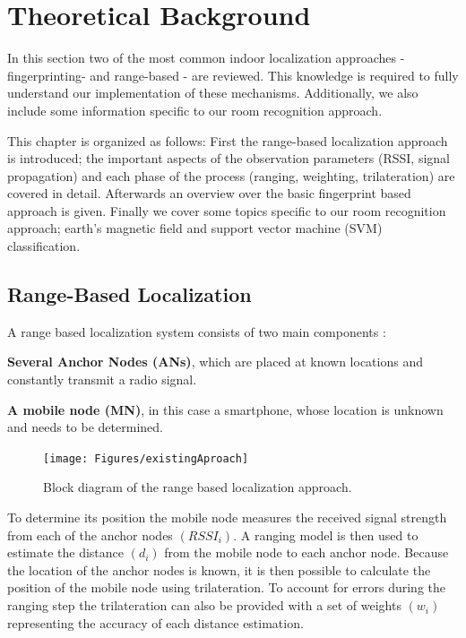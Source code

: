 
\chapter{Theoretical Background} %

\label{Chapter2} %

In this section two of the most common indoor localization approaches - fingerprinting- and range-based - are reviewed. This knowledge is required to fully understand our implementation of these mechanisms. Additionally, we also include some information specific to our room recognition approach.

This chapter is organized as follows: First the range-based localization approach is introduced; the important aspects of the observation parameters (RSSI, signal propagation) and each phase of the process (ranging, weighting, trilateration) are covered in detail. Afterwards an overview over the basic fingerprint based approach is given. Finally we cover some topics specific to our room recognition approach; earth's magnetic field and support vector machine (SVM) classification.

\section{Range-Based Localization}
\label{therory:range-based}

A range based localization system consists of two main components \citep{surveyIndoorTechniques}:

\textbf{Several Anchor Nodes (ANs)}, which are placed at known locations and constantly transmit a radio signal.

\textbf{A mobile node (MN)}, in this case a smartphone, whose location is unknown and needs to be determined.

\begin{figure}[ht]
\centering
\texttt{[image: Figures/existingAproach]}
\decoRule
\caption[Range-based localization approach]{Block diagram of the range based localization approach.}
\label{fig:existingApproach}
\end{figure}

To determine its position the mobile node measures the received signal strength from each of the anchor nodes $(RSSI_i)$. A ranging model is then used to estimate the distance $(d_i)$ from the mobile node to each anchor node. Because the location of the anchor nodes is known, it is then possible to calculate the position of the mobile node using trilateration. To account for errors during the ranging step the trilateration can also be provided with a set of weights $(w_i)$ representing the accuracy of each distance estimation.

